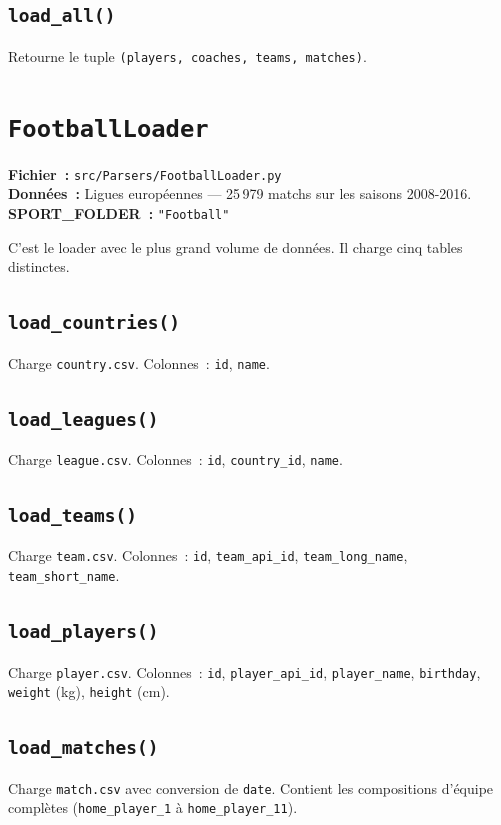 \documentclass[12pt,a4paper]{article}
\begin{document}
\subsection{\texttt{load\_all()}}
Retourne le tuple \texttt{(players, coaches, teams, matches)}.

\section{\texttt{FootballLoader}}

\textbf{Fichier~:} \texttt{src/Parsers/FootballLoader.py}\\
\textbf{Données~:} Ligues européennes — 25\,979 matchs sur les saisons
2008-2016.\\
\textbf{SPORT\_FOLDER~:} \texttt{"Football"}

C'est le loader avec le plus grand volume de données. Il charge cinq tables
distinctes.

\subsection{\texttt{load\_countries()}}
Charge \texttt{country.csv}. Colonnes~: \texttt{id}, \texttt{name}.

\subsection{\texttt{load\_leagues()}}
Charge \texttt{league.csv}. Colonnes~: \texttt{id}, \texttt{country\_id},
\texttt{name}.

\subsection{\texttt{load\_teams()}}
Charge \texttt{team.csv}. Colonnes~: \texttt{id}, \texttt{team\_api\_id},
\texttt{team\_long\_name}, \texttt{team\_short\_name}.

\subsection{\texttt{load\_players()}}
Charge \texttt{player.csv}. Colonnes~: \texttt{id}, \texttt{player\_api\_id},
\texttt{player\_name}, \texttt{birthday}, \texttt{weight} (kg),
\texttt{height} (cm).

\subsection{\texttt{load\_matches()}}
Charge \texttt{match.csv} avec conversion de \texttt{date}. Contient les
compositions d'équipe complètes (\texttt{home\_player\_1} à
\texttt{home\_player\_11}).
\end{document}
